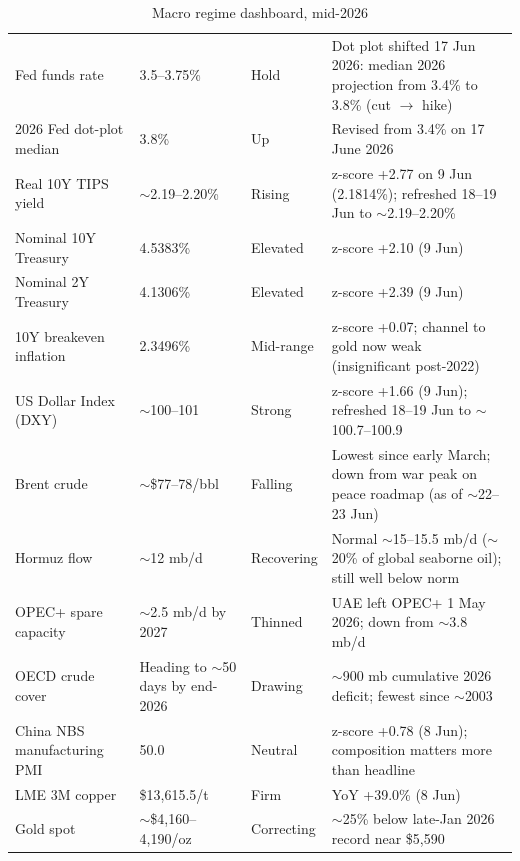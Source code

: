 \documentclass[11pt,a4paper]{article}
\begin{document}
\begin{table}[htbp]
\caption{Macro regime dashboard, mid-2026}
\small
\begin{tabularx}{\linewidth}{P{3.0cm} P{3.0cm} P{1.8cm} L}
\toprule
{} &  &  &  \\
\midrule
Fed funds rate & 3.5--3.75\% & Hold & Dot plot shifted 17 Jun 2026: median 2026 projection from 3.4\% to 3.8\% (cut \(\rightarrow\) hike) \\
2026 Fed dot-plot median & 3.8\% & Up & Revised from 3.4\% on 17 June 2026 \\
Real 10Y TIPS yield & \(\sim\)2.19--2.20\% & Rising & z-score +2.77 on 9 Jun (2.1814\%); refreshed 18--19 Jun to \(\sim\)2.19--2.20\% \\
Nominal 10Y Treasury & 4.5383\% & Elevated & z-score +2.10 (9 Jun) \\
Nominal 2Y Treasury & 4.1306\% & Elevated & z-score +2.39 (9 Jun) \\
10Y breakeven inflation & 2.3496\% & Mid-range & z-score +0.07; channel to gold now weak (insignificant post-2022) \\
US Dollar Index (DXY) & \(\sim\)100--101 & Strong & z-score +1.66 (9 Jun); refreshed 18--19 Jun to \(\sim\)100.7--100.9 \\
Brent crude & \(\sim\)\$77--78/bbl & Falling & Lowest since early March; down from war peak on peace roadmap (as of \(\sim\)22--23 Jun) \\
Hormuz flow & \(\sim\)12 mb/d & Recovering & Normal \(\sim\)15--15.5 mb/d (\(\sim\)20\% of global seaborne oil); still well below norm \\
OPEC+ spare capacity & \(\sim\)2.5 mb/d by 2027 & Thinned & UAE left OPEC+ 1 May 2026; down from \(\sim\)3.8 mb/d \\
OECD crude cover & Heading to \(\sim\)50 days by end-2026 & Drawing & \(\sim\)900 mb cumulative 2026 deficit; fewest since \(\sim\)2003 \\
China NBS manufacturing PMI & 50.0 & Neutral & z-score +0.78 (8 Jun); composition matters more than headline \\
LME 3M copper & \$13,615.5/t & Firm & YoY +39.0\% (8 Jun) \\
Gold spot & \(\sim\)\$4,160--4,190/oz & Correcting & \(\sim\)25\% below late-Jan 2026 record near \$5,590 \\
\bottomrule
\end{tabularx}
\end{table}
\end{document}
